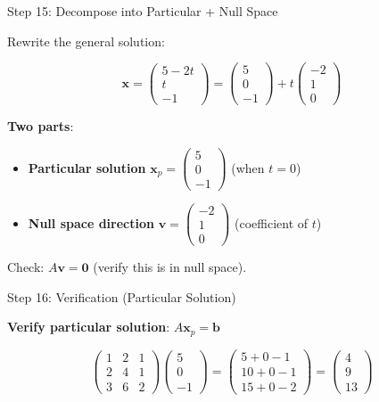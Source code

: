 \documentclass[10pt]{beamer}
\theoremstyle{definition}
\newcommand{\x}[1]{\alert{\textbf{#1}}}
\begin{document}
\begin{frame}{Step 15: Decompose into Particular + Null Space}

Rewrite the general solution:

$$\mathbf{x} = \begin{pmatrix} 5 - 2t \\ t \\ -1 \end{pmatrix} = \begin{pmatrix} 5 \\ 0 \\ -1 \end{pmatrix} + t \begin{pmatrix} -2 \\ 1 \\ 0 \end{pmatrix}$$

\vspace{1em}

\x{Two parts}:
\begin{itemize}
\item \x{Particular solution} $\mathbf{x}_p = \begin{pmatrix} 5 \\ 0 \\ -1 \end{pmatrix}$ (when $t=0$)
\item \x{Null space direction} $\mathbf{v} = \begin{pmatrix} -2 \\ 1 \\ 0 \end{pmatrix}$ (coefficient of $t$)
\end{itemize}

\vspace{1em}

Check: $A\mathbf{v} = \mathbf{0}$ (verify this is in null space).

\end{frame}

\begin{frame}{Step 16: Verification (Particular Solution)}

\x{Verify particular solution}: $A\mathbf{x}_p = \mathbf{b}$

$$\begin{pmatrix} 1&2&1 \\ 2&4&1 \\ 3&6&2 \end{pmatrix} \begin{pmatrix} 5\\0\\-1 \end{pmatrix} = \begin{pmatrix} 5+0-1 \\ 10+0-1 \\ 15+0-2 \end{pmatrix} = \begin{pmatrix} 4\\9\\13 \end{pmatrix}$$ \checkmark

\end{frame}
\end{document}
